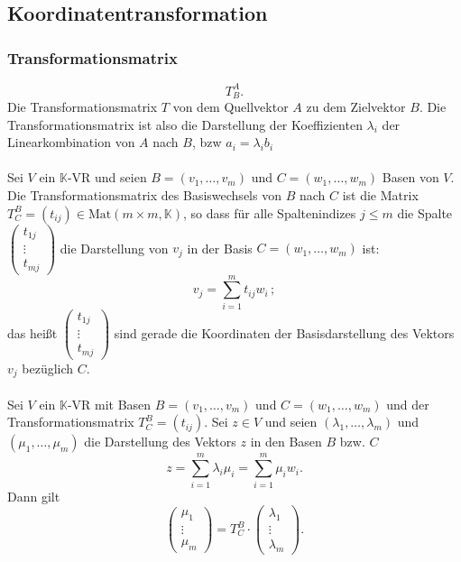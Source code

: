 \documentclass[a4paper,12pt]{article}
\begin{document}
\subsection{Koordinatentransformation}
\subsubsection{Transformationsmatrix}
\[ 
        T^A_B
.\] 
Die Transformationsmatrix $T$ von dem Quellvektor $A$ zu dem Zielvektor $B$. Die Transformationsmatrix ist also die Darstellung der Koeffizienten $\lambda _i$ der Linearkombination von $A$ nach $B$, bzw $a_i=\lambda_i b_i$ \\\\
Sei $V$ ein $\mathbb{K}$-VR und seien $B=\left(v_1,\hdots ,v_m\right)$ und $C=\left(w_1,\hdots ,w_m\right)$ Basen von $V$. Die Transformationsmatrix des Basiswechsels von $B$ nach $C$ ist die Matrix $T^B_C=\left(t_{ij}\right) \in \text{Mat}\left(m\times m,\mathbb{K}\right)$, so dass für alle Spaltenindizes $j\leq m$ die Spalte $\left(\begin{matrix}
        t_{1j}\\\vdots \\t_{mj}
\end{matrix}\right)$ die Darstellung von $v_j$ in der Basis $C=\left(w_1,\hdots ,w_m\right)$ ist:
\[ 
        v_j=\sum_{i=1}^{m}t_{ij}w_i
\,;\] 
das heißt $\left(\begin{matrix}
        t_{1j}\\\vdots \\t_{mj}
\end{matrix}\right)$ sind gerade die Koordinaten der Basisdarstellung des Vektors $v_j$ bezüglich $C$.\\\\
Sei $V$ ein $\mathbb{K}$-VR mit Basen $B=\left(v_1,\hdots ,v_m\right)$ und $C=\left(w_1,\hdots ,w_m\right)$ und der Transformationsmatrix $T^B_C=\left(t_{ij}\right)$. Sei $z \in V$ und seien $\left(\lambda _1,\hdots ,\lambda _m\right)$ und $\left(\mu _1,\hdots ,\mu _m\right)$ die Darstellung des Vektors $z$ in den Basen $B$ bzw. $C$
\[ 
        z=\sum_{i=1}^{m}\lambda _i\mu _i=\sum_{i=1}^{m}\mu _iw_i
.\] 
Dann gilt
\[ 
        \left(\begin{matrix}
                \mu _1\\\vdots\\\mu _m
        \end{matrix}\right)=T^B_C\cdot \left(\begin{matrix}
                \lambda _1\\\vdots\\\lambda _m
        \end{matrix}\right)
.\] 
\end{document}
